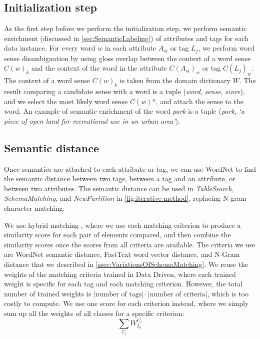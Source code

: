 \subsection{Initialization step}

As the first step before we perform the initialization step, we perform semantic enrichment (discussed in \autoref{sec:SemanticLabeling}) of attributes and tags for each data instance. For every word $w$ in each attribute $A_{si}$ or tag $L_j$, we perform word sense disambiguation by using gloss overlap between the context of a word sense $C(w)_k$ and the context of the word in the attribute $C(A_{si})_w$ or tag $C(L_j)_w$. The context of a word sense $C(w)_k$ is taken from the domain dictionary $W$. The result comparing a candidate sense with a word is a tuple (\textit{word}, \textit{sense}, \textit{score}), and we select the most likely word sense $C(w)$*, and attach the sense to the word. An example of semantic enrichment of the word \textit{park} is a tuple (\textit{park}, \textit{`a piece of open land for recreational use in an urban area'}).

\subsection{Semantic distance}

Once semantics are attached to each attribute or tag, we can use WordNet to find the semantic distance between two tags, between a tag and an attribute, or between two attributes. The semantic distance can be used in \textit{TableSearch}, \textit{SchemaMatching}, and \textit{NewPartition} in \autoref{fig:iterative-method}, replacing N-gram character matching.

We use hybrid matching \cite{Rahm2001Survey}, where we use each matching criterion to produce a similarity score for each pair of elements compared, and then combine the similarity scores once the scores from all criteria are available. The criteria we use are WordNet semantic distance, FastText word vector distance, and N-Gram distance that we described in \autoref{ssec:VariationsOfSchemaMatching}. We reuse the weights of the matching criteria trained in Data Driven, where each trained weight is specific for each tag and each matching criterion. However, the total number of trained weights is $\left|\text{number of tags}\right|\cdot\left|\text{number of criteria}\right|$, which is too costly to compute. We use one score for each criterion instead, where we simply sum up all the weights of all classes for a specific criterion:
\[
\sum_{C_{i}}\ensuremath{W}_{L_{t}}^{C_{i}}
\]

